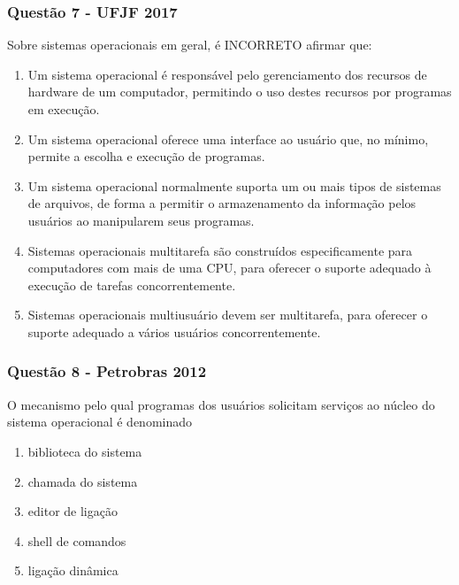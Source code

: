 \documentclass[aspectratio=169,
				xcolor=table]{beamer}
\begin{document}
	\begin{frame}
		\frametitle{Questão 7 - UFJF 2017}
		Sobre sistemas operacionais em geral, é INCORRETO afirmar que:
		\begin{enumerate}[a]
			\small
			\item Um sistema operacional é responsável pelo gerenciamento dos recursos de hardware de um computador, permitindo o uso destes recursos por programas em execução.  

			\item Um sistema operacional oferece uma interface ao usuário que, no mínimo, permite a escolha e execução de programas. 

			\item Um sistema operacional normalmente suporta um ou mais tipos de sistemas de arquivos, de forma a permitir o armazenamento da informação pelos usuários ao manipularem seus programas.  

			\item Sistemas operacionais multitarefa são construídos especificamente para computadores com mais de uma CPU, para oferecer o suporte adequado à execução de tarefas concorrentemente. 

			\item Sistemas operacionais multiusuário devem ser multitarefa, para oferecer o suporte adequado a vários usuários concorrentemente.

		\end{enumerate}

	\end{frame}
	
	\begin{frame}
		\frametitle{Questão 8 - Petrobras 2012}
		O mecanismo pelo qual programas dos usuários solicitam serviços ao núcleo do sistema operacional é denominado
		\begin{enumerate}[a]
			\item biblioteca do sistema

			\item chamada do sistema

			\item editor de ligação 

			\item shell de comandos

			\item ligação dinâmica

		\end{enumerate}

	\end{frame}
	
\end{document}
